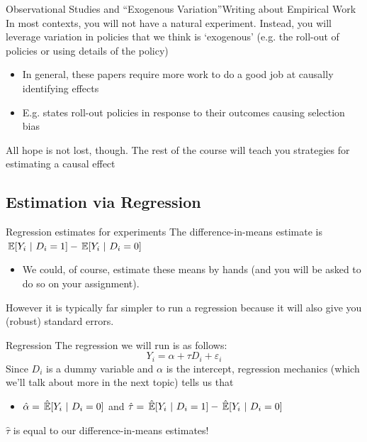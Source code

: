 \documentclass[aspectratio=169,t,11pt,table]{beamer}
\begin{document}
\begin{frame}{Observational Studies and ``Exogenous Variation''}{Writing about Empirical Work}
  In most contexts, you will not have a natural experiment. Instead, you will leverage variation in policies that we think is `exogenous' (e.g. the roll-out of policies or using details of the policy)

  \begin{itemize}
    \item In general, these papers require more work to do a good job at causally identifying effects
    
    \item E.g. states roll-out policies in response to their outcomes causing selection bias
  \end{itemize}

  \pause
  \bigskip
  All hope is not lost, though. The rest of the course will teach you strategies for estimating a causal effect
\end{frame}

\subsection{Estimation via Regression}

\begin{frame}{Regression estimates for experiments}
  The difference-in-means estimate is $\expec{Y_i}{D_i = 1} - \expec{Y_i}{D_i = 0}$
  \begin{itemize}
    \item We could, of course, estimate these means by hands (and you will be asked to do so on your assignment). 
  \end{itemize}

  However it is typically far simpler to run a regression because it will also give you (robust) standard errors. 
\end{frame}

\begin{frame}{Regression}
  The regression we will run is as follows:
  $$
    Y_i = \alpha + \tau D_i + \varepsilon_i
  $$
  Since $D_i$ is a dummy variable and $\alpha$ is the intercept, regression mechanics (which we'll talk about more in the next topic) tells us that 
  \begin{itemize}
    \item $\hat{\alpha} = \expechat{Y_i}{D_i = 0}$ and $\hat{\tau} = \expechat{Y_i}{D_i = 1} - \expechat{Y_i}{D_i = 0}$
  \end{itemize}

  \bigskip
  $\hat{\tau}$ is equal to our difference-in-means estimates! 
\end{frame}
\end{document}
